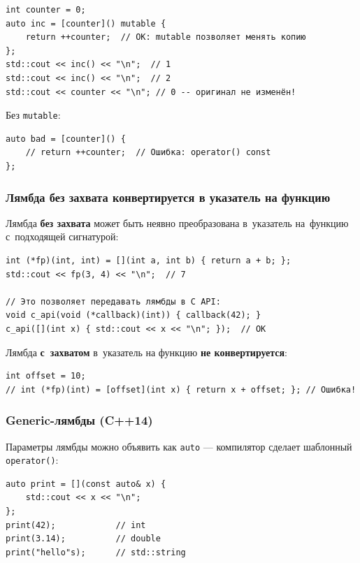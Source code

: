 \documentclass[a4paper,12pt]{article}
\begin{document}
\begin{lstlisting}
int counter = 0;
auto inc = [counter]() mutable {
    return ++counter;  // OK: mutable позволяет менять копию
};
std::cout << inc() << "\n";  // 1
std::cout << inc() << "\n";  // 2
std::cout << counter << "\n"; // 0 -- оригинал не изменён!
\end{lstlisting}

Без \texttt{mutable}:

\begin{lstlisting}
auto bad = [counter]() {
    // return ++counter;  // Ошибка: operator() const
};
\end{lstlisting}

\subsubsection{Лямбда без захвата конвертируется в указатель на функцию}

Лямбда \textbf{без захвата} может быть неявно преобразована в~указатель
на~функцию с~подходящей сигнатурой:

\begin{lstlisting}
int (*fp)(int, int) = [](int a, int b) { return a + b; };
std::cout << fp(3, 4) << "\n";  // 7

// Это позволяет передавать лямбды в C API:
void c_api(void (*callback)(int)) { callback(42); }
c_api([](int x) { std::cout << x << "\n"; });  // OK
\end{lstlisting}

Лямбда \textbf{с~захватом} в~указатель на функцию \textbf{не конвертируется}:

\begin{lstlisting}
int offset = 10;
// int (*fp)(int) = [offset](int x) { return x + offset; }; // Ошибка!
\end{lstlisting}

\subsubsection{Generic-лямбды (C++14)}

Параметры лямбды можно объявить как \texttt{auto} --- компилятор сделает
шаблонный \texttt{operator()}:

\begin{lstlisting}
auto print = [](const auto& x) {
    std::cout << x << "\n";
};
print(42);            // int
print(3.14);          // double
print("hello"s);      // std::string
\end{lstlisting}
\end{document}
